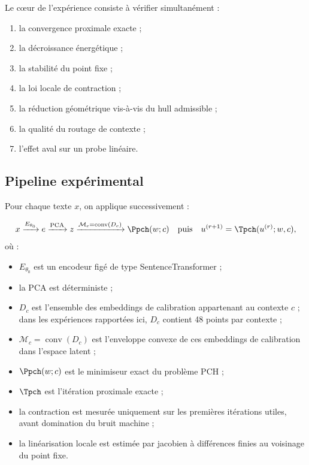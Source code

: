 Le cœur de l'expérience consiste à vérifier simultanément :
\begin{enumerate}
    \item la convergence proximale exacte ;
    \item la décroissance énergétique ;
    \item la stabilité du point fixe ;
    \item la loi locale de contraction ;
    \item la réduction géométrique vis-à-vis du hull admissible ;
    \item la qualité du routage de contexte ;
    \item l'effet aval sur un probe linéaire.
\end{enumerate}

\subsection{Pipeline expérimental}

Pour chaque texte \(x\), on applique successivement :

\[
x \xrightarrow{E_{\theta_0}} e \xrightarrow{\mathrm{PCA}} z \xrightarrow{\mathcal M_c=\operatorname{conv}(D_c)} \Ppch(w;c)
\quad\text{puis}\quad
u^{(r+1)}=\Tpch(u^{(r)};w,c),
\]
où :

\begin{itemize}
    \item \(E_{\theta_0}\) est un encodeur figé de type SentenceTransformer ;
    \item la PCA est déterministe ;
    \item \(D_c\) est l’ensemble des embeddings de calibration appartenant au contexte \(c\) ; dans les expériences rapportées ici, \(D_c\) contient 48 points par contexte ;
    \item \(\mathcal M_c = \operatorname{conv}(D_c)\) est l’enveloppe convexe de ces embeddings de calibration dans l’espace latent ;
    \item \(\Ppch(w;c)\) est le minimiseur exact du problème PCH ;
    \item \(\Tpch\) est l’itération proximale exacte ;
    \item la contraction est mesurée uniquement sur les premières itérations utiles, avant domination du bruit machine ;
    \item la linéarisation locale est estimée par jacobien à différences finies au voisinage du point fixe.
\end{itemize}


